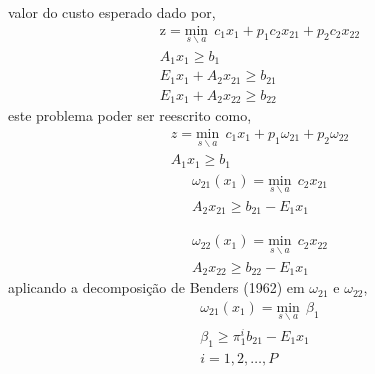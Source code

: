 \documentclass[12pt,fleqn]{article}
\begin{document}
valor do custo esperado dado por,
\begin{equation}
  \begin{aligned}
	\text{z} = \underset {s \backslash a} {\text{min}} \ \  c_1x_1 + p_1c_2x_{21} + p_2c_2x_{22} \\	
	A_1 x_1 \geq b_1 \\
	E_1 x_1 + A_2 x_{21} \geq b_{21} \\
	E_1 x_1 + A_2x_{22} \geq b_{22}
  \end{aligned}
	\label{pd1}
\end{equation}
este problema poder ser reescrito como,
\begin{equation}
  \begin{aligned}
	z = \underset {s \backslash a} {\text{min}} \ \  c_1x_1 + p_1{\omega}_{21} + p_2 {\omega}_{22} \\	
	A_1 x_1 \geq b_1 
  \end{aligned} 
	\label{pd2}
\end{equation}
\begin{equation} 
  \begin{aligned}
	{\omega}_{21}(x_1) = \underset {s \backslash a} {\text{min}} \ \ c_2x_{21} \\
	 A_2 x_{21} \geq b_{21} - E_1 x_1 
  \end{aligned}
    \label{pd3}
\end{equation}

\begin{equation}
  \begin{aligned}
	{\omega}_{22}(x_1) = \underset {s \backslash a}{\text{min}} \ \ c_2x_{22} \\
	A_2x_{22} \geq b_{22} - E_1 x_1 
  \end{aligned}
    \label{pd4}
\end{equation}
aplicando a decomposi\c c\~ao de Benders (1962) em ${\omega}_{21}$ e ${\omega}_{22}$,  
\begin{equation*}
  \begin{aligned}
	{\omega}_{21}(x_1) = \underset {s \backslash a}{\text{min}} \ \ {\beta}_{1} \\
	{\beta}_{1}  \geq {\pi}_{1}^{i}b_{21} - E_1 x_1 \\
	i = 1,2,\dots, P \\
  \end{aligned}
\end{equation*}
\end{document}
